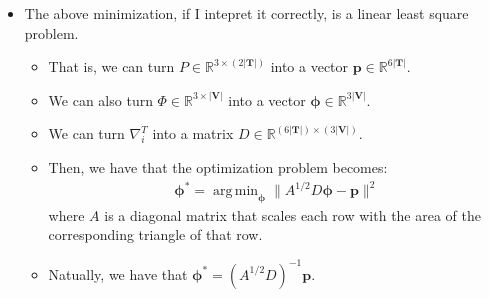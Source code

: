 \documentclass[10pt]{article}
\newcommand{\ve}[1]{\mathbf{#1}}
\newcommand{\ves}[1]{\boldsymbol{#1}}
\newcommand{\Real}{\mathbb{R}}
\DeclareMathOperator*{\argmin}{arg\,min}
\begin{document}
\begin{itemize}
\begin{itemize}
        \item The above minimization, if I intepret it correctly, is a linear least square problem.
        \begin{itemize}
            \item That is, we can turn $P \in \Real^{3 \times (2|\ve{T}|)}$ into a vector $\ve{p} \in \Real^{6|\ve{T}|}$.
            \item We can also turn $\Phi \in \Real^{3 \times |\ve{V}|}$ into a vector $\ves{\phi} \in \Real^{3|\ve{V}|}$.
            \item We can turn $\nabla^T_i$ into a matrix $D \in \Real^{(6|\ve{T}|) \times (3|\ve{V}|)}.$ 
            \item Then, we have that the optimization problem becomes:
            \begin{align*}
                \ves{\phi}^* = \argmin_{\ves{\phi}} \| A^{1/2} D \ves{\phi} - \ve{p} \|^2
            \end{align*}
            where $A$ is a diagonal matrix that scales each row with the area of the corresponding triangle of that row.
            \item Natually, we have that $\ves{\phi}^* = (A^{1/2} D)^{-1} \ve{p}$.
        \end{itemize}
    \end{itemize}
\end{itemize}



  
\end{document}

